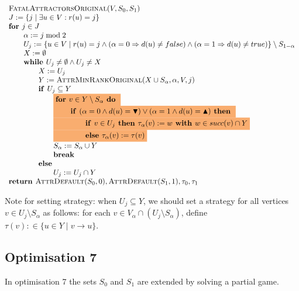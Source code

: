 \documentclass{article}
\newcommand{\If}{\text{\textbf{if }}}
\newcommand{\Do}{\text{\textbf{ do }}}
\newcommand{\Then}{\text{\textbf{ then }}}
\newcommand{\Else}{\text{\textbf{else }}}
\newcommand{\For}{\text{\textbf{for }}}
\newcommand{\While}{\text{\textbf{while }}}
\newcommand{\Return}{\text{\textbf{return }}}
\begin{document}
\begin{equation*}
\begin{array}{l}
\text{\textsc{FatalAttractorsOriginal}}(V, S_0, S_1)\\
J := \{ j \mid \exists u \in V : r(u) = j \} \\
\textbf{for } j \in J \\
\qquad \alpha := j \bmod 2\\
\qquad U_j := \{u \in V \mid r(u) = j \wedge (\alpha = 0 \Rightarrow d(u) \neq false) 
\wedge (\alpha = 1 \Rightarrow d(u) \neq true) \} \setminus S_{1-\alpha} \\
\qquad X := \emptyset \\
\qquad \While U_j \neq \emptyset \wedge U_j \neq X \\ 
\qquad \qquad X := U_j\\
\qquad \qquad Y := \textsc{AttrMinRankOriginal}(X \cup S_\alpha, \alpha, V, j) \\
\qquad \qquad \If U_j \subseteq Y \\
\qquad \qquad \qquad \colorbox{Apricot}{$ \For v \in Y \setminus S_{\alpha} \Do $} \\
\qquad \qquad \qquad \colorbox{Apricot}{$ \qquad \If (\alpha = 0 \land d(u) = \blacktriangledown) \lor (\alpha = 1 \land d(u) = \blacktriangle) \Then $} \\
\qquad \qquad \qquad \colorbox{Apricot}{$ \qquad \qquad \If v \in U_j \Then \tau_{\alpha}(v) := w \textbf{ with } w \in succ(v) \cap Y $} \\
\qquad \qquad \qquad \colorbox{Apricot}{$ \qquad \qquad \Else \tau_{\alpha}(v) := \tau(v) $} \\
\qquad \qquad \qquad S_\alpha := S_\alpha \cup Y \\
\qquad \qquad \qquad \textbf{break} \\
\qquad \qquad \textbf{else }\\
\qquad \qquad \qquad U_j := U_j \cap Y\\
\Return \textsc{AttrDefault}(S_0, 0), \textsc{AttrDefault}(S_1, 1), \tau_0,\tau_1
\end{array}
\end{equation*}

Note for setting strategy: when $U_j \subseteq Y$, we should set a strategy for all vertices $v \in U_j \setminus S_\alpha$ as follows: for each $v \in V_\alpha \cap (U_j \setminus S_\alpha)$, define $\tau(v) :\in \{ u \in Y \mid v \to u \}$.

\subsection{Optimisation 7}
In optimisation 7 the sets $S_0$ and $S_1$ are extended by solving a partial game.
\end{document}

